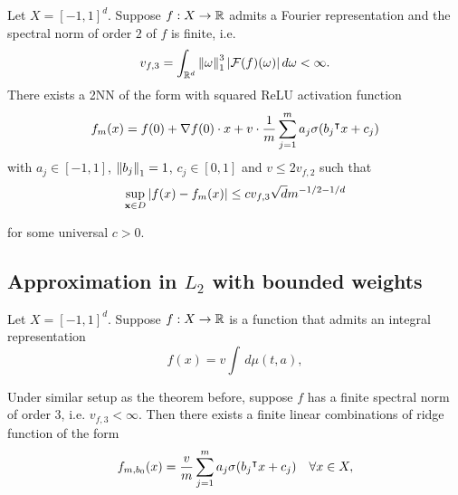 \begin{theorem}
    Let $X = [-1,1]^d$. Suppose $f: X \to \mathbb{R}$ admits a Fourier representation
    and the spectral norm of order $2$ of $f$ is finite, i.e.
    \begin{equation}
        v_{f,3} = \int_{\mathbb{R}^d} \left\| \omega \right\|_1^3 \left| \mathcal{F}(f)(\omega) \right| 
        d\omega < \infty.
    \end{equation}
    There exists a 2NN of the form with squared ReLU activation function
    \begin{equation}
        f_m(x) = f(0) + \nabla f(0) \cdot x + v \cdot 
        \frac{1}{m} \sum_{j=1}^m a_j \sigma(b_j{}^{\intercal} x + c_j)
    \end{equation}
    with $a_j\in[-1,1]$, $\left\| b_j \right\|_1 = 1$, $c_j\in[0,1]$ and $v \leq
    2v_{f,2}$ such that
    \begin{equation}
        \sup_{\mathbf{x} \in D} \left| f(x) - f_m(x) \right| \leq 
        c v_{f,3} \sqrt{d} m^{-1/2-1/d}
    \end{equation}

    for some universal $c > 0$.
\end{theorem}

\subsection{Approximation in $L_2$ with bounded weights}

\begin{theorem}
    Let $X=[-1,1]^d$. Suppose $f: X \to \mathbb{R}$ is a function that admits an
    integral representation
    \begin{equation}
        f(x) = v \int \,d\mu(t,a),
    \end{equation}

\end{theorem}


\begin{theorem}
    Under similar setup as the theorem before, suppose $f$ has a finite spectral
    norm of order $3$, i.e. $v_{f,3} < \infty$. Then there exists a finite
    linear combinations of ridge function of the form
    \begin{equation}
        f_{m, b_0}(x) = \frac{v}{m}\sum_{j=1}^m a_j \sigma_{\text{}}(b_j{}^{\intercal} x + c_j)
        \quad \forall x \in X,
    \end{equation}

\end{theorem}


\newpage

